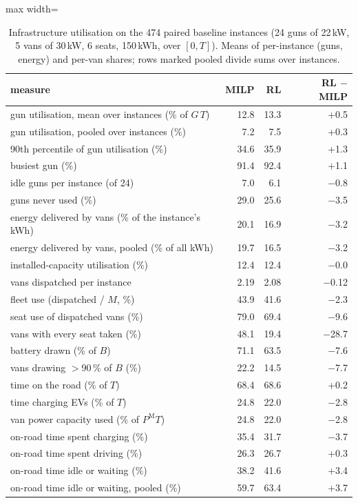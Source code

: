 \begin{table}[H]\centering
\small
\caption{Infrastructure utilisation on the 474 paired baseline instances (24 guns of 22\,kW, 5 vans of 30\,kW, 6 seats, 150\,kWh, over $[0,T]$). Means of per-instance (guns, energy) and per-van shares; rows marked pooled divide sums over instances.}\label{tab:utilm}
\begin{adjustbox}{max width=\textwidth}\begin{tabular}{lrrr}\toprule
measure & MILP & RL & RL $-$ MILP \\ \midrule
gun utilisation, mean over instances (\% of $G\,T$) & 12.8 & 13.3 & +0.5 \\
gun utilisation, pooled over instances (\%) & 7.2 & 7.5 & +0.3 \\
90th percentile of gun utilisation (\%) & 34.6 & 35.9 & +1.3 \\
busiest gun (\%) & 91.4 & 92.4 & +1.1 \\
idle guns per instance (of 24) & 7.0 & 6.1 & $-$0.8 \\
guns never used (\%) & 29.0 & 25.6 & $-$3.5 \\
energy delivered by vans (\% of the instance's kWh) & 20.1 & 16.9 & $-$3.2 \\
energy delivered by vans, pooled (\% of all kWh) & 19.7 & 16.5 & $-$3.2 \\
installed-capacity utilisation (\%) & 12.4 & 12.4 & $-$0.0 \\
vans dispatched per instance & 2.19 & 2.08 & $-$0.12 \\
fleet use (dispatched / $M$, \%) & 43.9 & 41.6 & $-$2.3 \\
seat use of dispatched vans (\%) & 79.0 & 69.4 & $-$9.6 \\
vans with every seat taken (\%) & 48.1 & 19.4 & $-$28.7 \\
battery drawn (\% of $B$) & 71.1 & 63.5 & $-$7.6 \\
vans drawing $>$90\,\% of $B$ (\%) & 22.2 & 14.5 & $-$7.7 \\
time on the road (\% of $T$) & 68.4 & 68.6 & +0.2 \\
time charging EVs (\% of $T$) & 24.8 & 22.0 & $-$2.8 \\
van power capacity used (\% of $P^{\mathrm M}T$) & 24.8 & 22.0 & $-$2.8 \\
on-road time spent charging (\%) & 35.4 & 31.7 & $-$3.7 \\
on-road time spent driving (\%) & 26.3 & 26.7 & +0.3 \\
on-road time idle or waiting (\%) & 38.2 & 41.6 & +3.4 \\
on-road time idle or waiting, pooled (\%) & 59.7 & 63.4 & +3.7 \\
\bottomrule\end{tabular}\end{adjustbox}\end{table}
